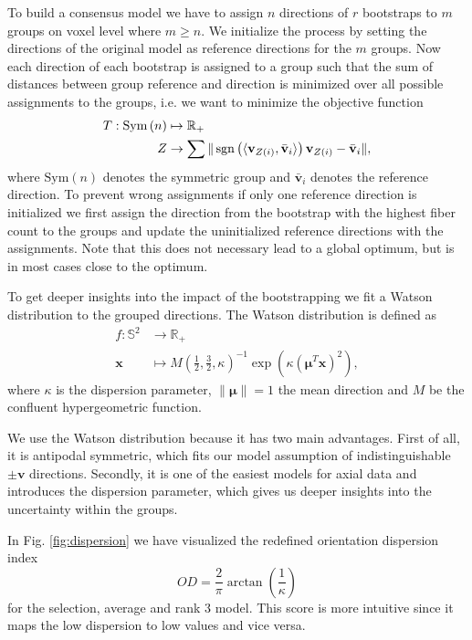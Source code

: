To build a consensus model we have to assign $n$ directions of $r$ bootstraps to $m$ groups on voxel
level where $m \geq n$. We initialize the process by setting the directions of the original model
as reference directions for the $m$ groups. Now each
direction of each bootstrap is assigned to a group such that the sum of
distances between group
reference and direction is minimized over all possible assignments to the
groups, i.e. we want to minimize the objective function 
\begin{align}
	T : \text{Sym} \left( n \right) & \mapsto \mathbb{R}_+ \nonumber \\
	Z & \rightarrow \sum \| \operatorname*{sgn} \left( \langle \mathbf{v}_{Z\left( i
	\right)}, \bar{\mathbf{v}}_i \rangle \right) \mathbf{v}_{Z\left( i
	\right)} - \bar{\mathbf{v}}_i\| ,  
\end{align} 
where $\text{Sym}\left( n \right)$ denotes the symmetric group and
$\bar{\mathbf{v}}_i$ denotes
the reference direction. To prevent wrong assignments if only one reference
direction is initialized we first assign the direction from the bootstrap with
the  highest fiber count to the
groups and update the uninitialized reference directions with the assignments.
Note that this does not necessary lead to a global optimum, but is in most cases
close to the optimum. 

To get deeper insights into the impact of the bootstrapping we fit a Watson
distribution to the grouped directions. The Watson distribution is defined as  
\begin{align*}
	f : \mathbb{S}^2 & \longrightarrow  \mathbb{R}_+ \\
	\mathbf{x} & \longmapsto  M \left( \frac{1}{2}, \frac{3}{2} , \kappa
	\right)^{-1} \exp \left(  \kappa
	\left( \mathbf{\mu}^T \mathbf{x} \right)^2 
	\right) 	,  
\end{align*}
where $\kappa$ is the dispersion parameter, $\| \mathbf{\mu} \| = 1$ the
mean direction and $M$ be the confluent hypergeometric function. 

We use the Watson distribution because it has two main advantages. First of all, it is antipodal symmetric,
which fits our model assumption of indistinguishable $\pm \mathbf{v}$
directions. Secondly, it is one of the easiest models for axial data and
introduces the dispersion parameter, which gives  us deeper insights into the
uncertainty within the groups. 

In Fig. \ref{fig:dispersion} we have visualized the redefined orientation dispersion index
\cite{dispersionParameter}  
\[ OD = \frac{2}{\pi} \arctan \left( \frac{1}{\kappa} \right) \] 
for the selection, average and rank 3 model. This score is more intuitive since
it maps the low dispersion to low values and vice versa. 

